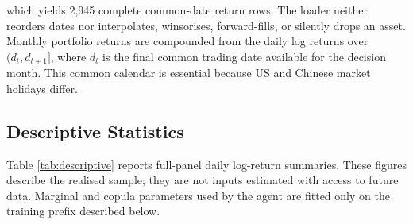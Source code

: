 which yields 2,945 complete common-date return rows. The loader neither reorders dates nor interpolates, winsorises, forward-fills, or silently drops an asset. Monthly portfolio returns are compounded from the daily log returns over $(d_t,d_{t+1}]$, where $d_t$ is the final common trading date available for the decision month. This common calendar is essential because US and Chinese market holidays differ.

\subsection{Descriptive Statistics}
\label{subsec:4_descriptive_statistics}

Table \ref{tab:descriptive} reports full-panel daily log-return summaries. These figures describe the realised sample; they are not inputs estimated with access to future data. Marginal and copula parameters used by the agent are fitted only on the training prefix described below.

\begin{table}[H]
\centering
\caption{Daily Log-Return Descriptive Statistics, December 2013--July 2026}
\label{tab:descriptive}
\caption*{\footnotesize Notes: Statistics use all 2,945 synchronized daily log returns and are descriptive. Excess kurtosis is relative to the Gaussian value of zero.}
\end{table}

